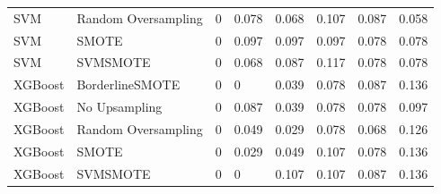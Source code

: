 \begin{tabular}{llllllll}
                         SVM & Random Oversampling &     0 &                     0.078 &                 0.068 &                  0.107 &                                   0.087 &    0.058 \\
                         SVM &               SMOTE &     0 &                     0.097 &                 0.097 &                  0.097 &                                   0.078 &    0.078 \\
                         SVM &            SVMSMOTE &     0 &                     0.068 &                 0.087 &                  0.117 &                                   0.078 &    0.078 \\
                     XGBoost &     BorderlineSMOTE &     0 &                         0 &                 0.039 &                  0.078 &                                   0.087 &    0.136 \\
                     XGBoost &       No Upsampling &     0 &                     0.087 &                 0.039 &                  0.078 &                                   0.078 &    0.097 \\
                     XGBoost & Random Oversampling &     0 &                     0.049 &                 0.029 &                  0.078 &                                   0.068 &    0.126 \\
                     XGBoost &               SMOTE &     0 &                     0.029 &                 0.049 &                  0.107 &                                   0.078 &    0.136 \\
                     XGBoost &            SVMSMOTE &     0 &                         0 &                 0.107 &                  0.107 &                                   0.087 &    0.136 \\
\bottomrule
\end{tabular}
